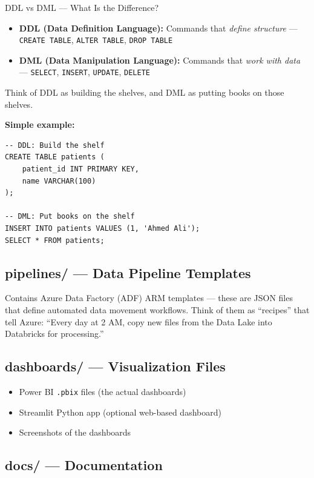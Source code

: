 \documentclass[12pt, a4paper, oneside]{report}
\begin{document}
\begin{conceptbox}{DDL vs DML --- What Is the Difference?}
\begin{itemize}
    \item \textbf{DDL (Data Definition Language):} Commands that \textit{define structure} --- \texttt{CREATE TABLE}, \texttt{ALTER TABLE}, \texttt{DROP TABLE}
    \item \textbf{DML (Data Manipulation Language):} Commands that \textit{work with data} --- \texttt{SELECT}, \texttt{INSERT}, \texttt{UPDATE}, \texttt{DELETE}
\end{itemize}
Think of DDL as building the shelves, and DML as putting books on those shelves.

\textbf{Simple example:}
\begin{lstlisting}[style=sqlstyle]
-- DDL: Build the shelf
CREATE TABLE patients (
    patient_id INT PRIMARY KEY,
    name VARCHAR(100)
);

-- DML: Put books on the shelf
INSERT INTO patients VALUES (1, 'Ahmed Ali');
SELECT * FROM patients;
\end{lstlisting}
\end{conceptbox}

\subsection{pipelines/ --- Data Pipeline Templates}

Contains Azure Data Factory (ADF) ARM templates --- these are JSON files that define automated data movement workflows. Think of them as ``recipes'' that tell Azure: ``Every day at 2 AM, copy new files from the Data Lake into Databricks for processing.''

\subsection{dashboards/ --- Visualization Files}

\begin{itemize}
    \item Power BI \texttt{.pbix} files (the actual dashboards)
    \item Streamlit Python app (optional web-based dashboard)
    \item Screenshots of the dashboards
\end{itemize}

\subsection{docs/ --- Documentation}
\end{document}
